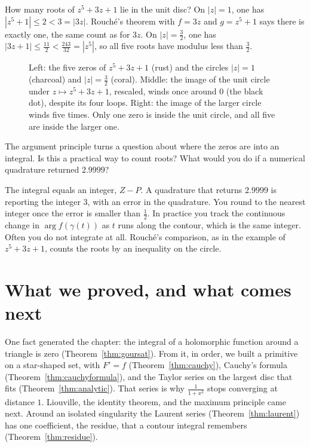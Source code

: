 \begin{example}
How many roots of $z^5+3z+1$ lie in the unit disc? On $|z|=1$, one has $|z^5+1|\le2<3=|3z|$. Rouch\'e's theorem with $f=3z$ and $g=z^5+1$ says there is exactly one, the same count as for $3z$. On $|z|=\frac32$, one has $|3z+1|\le\frac{11}2<\frac{243}{32}=|z^5|$, so all five roots have modulus less than $\frac32$.
\end{example}

\begin{figure}[ht]
\centering
{}
\caption{Left: the five zeros of $z^5+3z+1$ (rust) and the circles $|z|=1$ (charcoal) and $|z|=\frac32$ (coral). Middle: the image of the unit circle
under $z\mapsto z^5+3z+1$, rescaled, winds once around $0$ (the black dot), despite its four loops. Right: the image of the larger circle winds
five times. Only one zero is inside the unit circle, and all five are inside the larger one.}
\label{fig:winding}
\end{figure}

\begin{think}
The argument principle turns a question about where the zeros are into an integral. Is this a practical way to count roots? What would you do if a numerical quadrature returned $2.9999$?
\end{think}

The integral equals an integer, $Z-P$. A quadrature that returns $2.9999$ is reporting the integer $3$, with an error in the quadrature. You round to the nearest integer once the error is smaller than $\frac12$. In practice you track the continuous change in $\arg f(\gamma(t))$ as $t$ runs along the contour, which is the same integer. Often you do not integrate at all. Rouch\'e's comparison, as in the example of $z^5+3z+1$, counts the roots by an inequality on the circle.

\section{What we proved, and what comes next}

One fact generated the chapter: the integral of a holomorphic function around a triangle is zero (Theorem~\ref{thm:goursat}). From it, in order, we built a primitive on a star-shaped set, with $F'=f$ (Theorem~\ref{thm:cauchy}), Cauchy's formula (Theorem~\ref{thm:cauchyformula}), and the Taylor series on the largest disc that fits (Theorem~\ref{thm:analytic}). That series is why $\frac1{1+x^2}$ stops converging at distance $1$. Liouville, the identity theorem, and the maximum principle came next. Around an isolated singularity the Laurent series (Theorem~\ref{thm:laurent}) has one coefficient, the residue, that a contour integral remembers (Theorem~\ref{thm:residue}).

